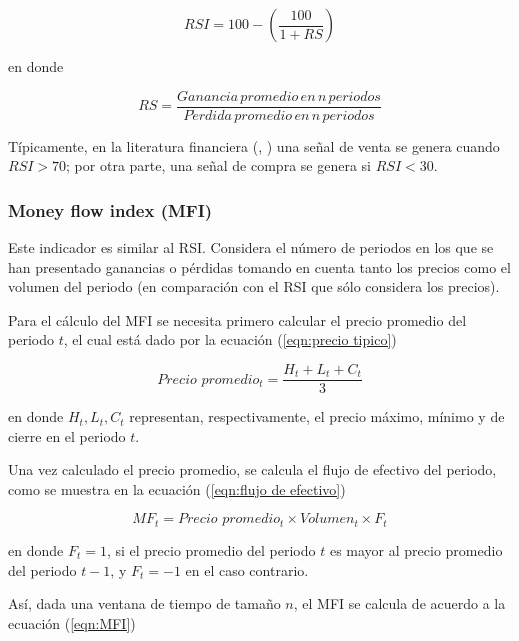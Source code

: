 \documentclass[12pt]{scrbook}
\theoremstyle{break}
\theoremstyle{break}
\begin{document}
\begin{equation} \label{eqn:RSI}
RSI = 100 - \left( \frac{100}{1 + RS} \right)
\end{equation}

en donde 

\begin{equation} \label{eqn:RSI RS}
RS = \frac{Ganancia\,promedio\,en\,n\,periodos}{P\acute{e}rdida\,promedio\,en\,n\,periodos}
\end{equation}

Típicamente, en la literatura financiera (\cite{technicalAnalysisKirkPatrick}, \cite{encycoplediaTechnicalIndicators}) una señal de venta se genera cuando $RSI > 70$; por otra parte, una señal de compra se genera si $RSI < 30$.

\subsubsection{Money flow index (MFI)}
\label{subsubseccion:money flow index}
Este indicador es similar al RSI. Considera el número de periodos en los que se han presentado ganancias o pérdidas tomando en cuenta tanto los precios como el volumen del periodo (en comparación con el RSI que sólo considera los precios).

Para el cálculo del MFI se necesita primero calcular el precio promedio del periodo $t$, el cual está dado por la ecuación (\ref{eqn:precio tipico})

\begin{equation} \label{eqn:precio tipico}
Precio\, \, promedio_t = \dfrac{H_{t} + L_{t} + C_{t}}{3}
\end{equation}

en donde $H_{t}, L_t, C_t$ representan, respectivamente, el precio máximo, mínimo y de cierre en el periodo $t$.

Una vez calculado el precio promedio, se calcula el flujo de efectivo del periodo, como se muestra en la ecuación (\ref{eqn:flujo de efectivo})

\begin{equation} \label{eqn:flujo de efectivo}
MF_t = Precio\, \, promedio_t \times Volumen_t \times F_t
\end{equation}

en donde $F_t = 1$, si el precio promedio del periodo $t$ es mayor al precio promedio del periodo $t-1$, y $F_t = -1$ en el caso contrario.

Así, dada una ventana de tiempo de tamaño $n$, el MFI se calcula de acuerdo a la ecuación (\ref{eqn:MFI})
\end{document}
